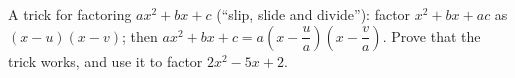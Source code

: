 A trick for factoring $ax^2+bx+c$ (``slip, slide and divide''): factor $x^2+bx+ac$ as $(x-u)(x-v)$; then $ax^2+bx+c=a\left(x-\dfrac {u}{a}\right)\left(x-\dfrac {v}{a}\right)$. Prove that the trick works, and use it to factor $2x^2-5x+2$.
